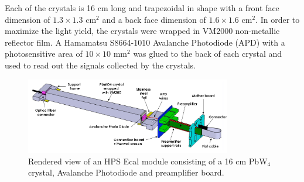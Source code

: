 Each of the crystals is 16 cm long and trapezoidal in shape with a front face
dimension of $1.3 \times 1.3$ cm$^2$ and a back face dimension of $1.6 \times
1.6$ cm$^2$.  In order to maximize the light yield, the crystals were wrapped
in VM2000 non-metallic reflector film. A Hamamatsu S8664-1010 Avalanche 
Photodiode (APD) with a photosensitive area of $10 \times 10$ mm$^2$ was glued
to the back of each crystal and used to read out the signals collected by the
crystals.  
\begin{figure}
    \centering
    \includegraphics[width=0.8\textwidth]{images/ecal_crystal.png}
    \caption{Rendered view of an HPS Ecal module consisting of a 16 cm PbW$_4$
             crystal, Avalanche Photodiode and preamplifier board.}
    \label{fig:ecal_crystal}
\end{figure}

 









